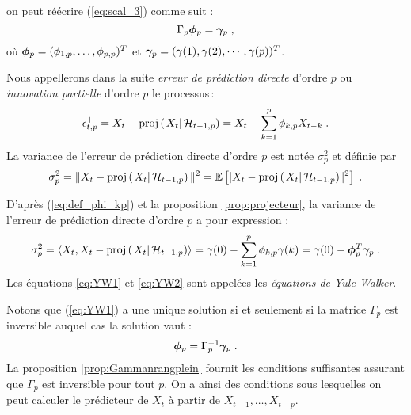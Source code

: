 on peut r\'e\'ecrire (\ref{eq:scal_3}) comme suit :
\begin{equation}\label{eq:YW1}
 \Gamma_p {\boldsymbol{\phi}}_p = {\boldsymbol{\gamma}}_p\;,
\end{equation}
o\`u ${\boldsymbol{\phi}}_p=(\phi_{1,p},\dots,\phi_{p,p})^T$ et
${\boldsymbol{\gamma}}_p=(\gamma(1), \gamma(2), \cdots, \gamma(p))^T$.

\begin{definition}
Nous appellerons dans la suite
\emph{erreur de pr\'ediction directe} d'ordre $p$ ou
\emph{innovation partielle} d'ordre $p$ le processus\,:
\begin{equation}
\label{eq:deferreurforward}
 \epsilon_{t,p}^+
 = X_t - \proj{X_t}{\cH_{t-1,p}}
 = X_t - \sum_{k=1}^{p} \phi_{k,p} X_{t-k}\;.
\end{equation}
La variance de l'erreur de pr\'ediction directe d'ordre $p$ est not\'ee
$\sigma_p^2$ et d\'efinie par
\begin{equation}\label{eq:var_pred_dir}
\sigma_p^2=\|X_t - \proj{X_t}{\cH_{t-1,p}}\|^2=\PE{|X_t -
  \proj{X_t}{\cH_{t-1,p}}|^2}\;.
\end{equation}
\end{definition}
D'apr\`es (\ref{eq:def_phi_kp}) et la proposition \ref{prop:projecteur},
la variance de l'erreur de pr\'ediction directe d'ordre $p$ a pour expression :
\begin{equation}
 \label{eq:YW2}
 \sigma_p^2 = \pscal{X_t}{X_t - \proj{X_t}{\cH_{t-1,p}}}
            =\gamma(0)- \sum_{k=1}^p \phi_{k,p}\gamma(k)
            =\gamma(0)-\bfphi_p^T\bfgamma_p\;.
\end{equation}
Les \'equations \eqref{eq:YW1} et \eqref{eq:YW2} sont appel\'ees les
\emph{\'equations de Yule-Walker}.

Notons que (\ref{eq:YW1}) a une unique solution si et seulement si
la matrice $\Gamma_p$ est inversible auquel cas la solution vaut :
\begin{equation}\label{eq:sol_unique}
{\boldsymbol{\phi}}_p=\Gamma_p^{-1} {\boldsymbol{\gamma}}_p\; .
\end{equation}
La proposition \ref{prop:Gammanrangplein} fournit les conditions suffisantes assurant
que $\Gamma_p$ est inversible pour tout $p$.  On a ainsi des conditions
sous lesquelles on peut calculer le pr\'edicteur de $X_t$ \`a partir de
$X_{t-1},\dots,X_{t-p}$.



